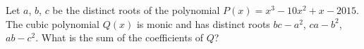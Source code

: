 Let $a$, $b$, $c$ be the distinct roots of the polynomial $P(x) = x^3 - 10x^2 + x - 2015$.
The cubic polynomial $Q(x)$ is monic and has distinct roots $bc-a^2$, $ca-b^2$, $ab-c^2$.
What is the sum of the coefficients of $Q$?
